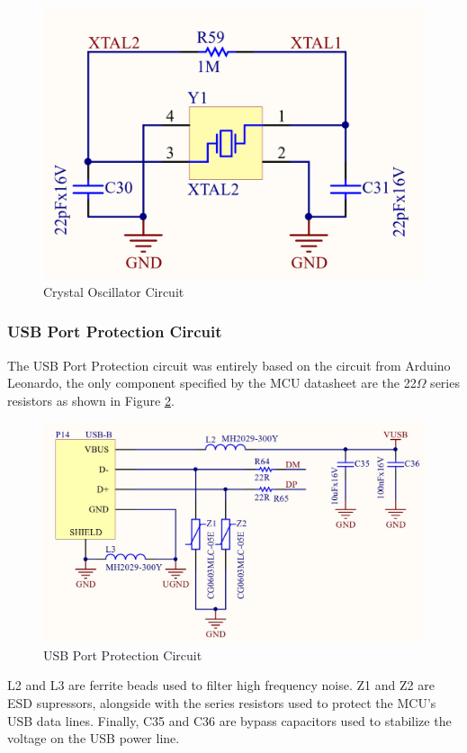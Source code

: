 			\begin{figure}[htbp]
				\centering
				\includegraphics[width=.6\textwidth]{figuras/fig-crystal-oscillator-circuit}
				\caption{Crystal Oscillator Circuit}
				\label{fig:crystal-oscillator-circuit}
			\end{figure}
			

		\subsubsection{USB Port Protection Circuit}\label{sssec:usb-port-protection}
			The USB Port Protection circuit was entirely based on the circuit from Arduino Leonardo, the only component specified by the MCU datasheet are the 22$\Omega$ series resistors as shown in Figure \ref{fig:usb-port-protection-circuit}.

			\begin{figure}[htbp]
				\centering
				\includegraphics[width=.8\textwidth]{figuras/fig-usb-port-protection-circuit}
				\caption{USB Port Protection Circuit}
				\label{fig:usb-port-protection-circuit}
			\end{figure}

			L2 and L3 are ferrite beads used to filter high frequency noise. Z1 and Z2 are ESD supressors, alongside with the series resistors used to protect the MCU's USB data lines. Finally, C35 and C36 are bypass capacitors used to stabilize the voltage on the USB power line.